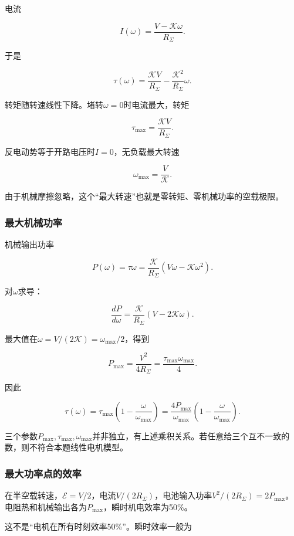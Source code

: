 \documentclass[12pt,a4paper,fontset=fandol]{ctexart}
\begin{document}
电流

\[
I(\omega)=\frac{V-\mathcal K\omega}{R_\Sigma}.
\]

于是

\[
\boxed{\tau(\omega)=\frac{\mathcal K V}{R_\Sigma}
-\frac{\mathcal K^2}{R_\Sigma}\omega}.
\]

转矩随转速线性下降。堵转\(\omega=0\)时电流最大，转矩

\[
\boxed{\tau_{\max}=\frac{\mathcal K V}{R_\Sigma}}.
\]

反电动势等于开路电压时\(I=0\)，无负载最大转速

\[
\boxed{\omega_{\max}=\frac V{\mathcal K}}.
\]

由于机械摩擦忽略，这个``最大转速''也就是零转矩、零机械功率的空载极限。

\subsubsection{最大机械功率}\label{ux6700ux5927ux673aux68b0ux529fux7387}

机械输出功率

\[
P(\omega)=\tau\omega
=\frac{\mathcal K}{R_\Sigma}
(V\omega-\mathcal K\omega^2).
\]

对\(\omega\)求导：

\[
\frac{dP}{d\omega}
=\frac{\mathcal K}{R_\Sigma}(V-2\mathcal K\omega).
\]

最大值在\(\omega=V/(2\mathcal K)=\omega_{\max}/2\)，得到

\[
\boxed{P_{\max}=\frac{V^2}{4R_\Sigma}
=\frac{\tau_{\max}\omega_{\max}}4}.
\]

因此

\[
\boxed{
\tau(\omega)=\tau_{\max}
\left(1-\frac\omega{\omega_{\max}}\right)
=\frac{4P_{\max}}{\omega_{\max}}
\left(1-\frac\omega{\omega_{\max}}\right)}.
\]

三个参数\(P_{\max},\tau_{\max},\omega_{\max}\)并非独立，有上述乘积关系。若任意给三个互不一致的数，则不符合本题线性电机模型。

\subsubsection{最大功率点的效率}\label{ux6700ux5927ux529fux7387ux70b9ux7684ux6548ux7387}

在半空载转速，\(\mathcal E=V/2\)，电流\(V/(2R_\Sigma)\)，电池输入功率\(V^2/(2R_\Sigma)=2P_{\max}\)。电阻热和机械输出各为\(P_{\max}\)，瞬时机电效率为50\%。

这不是``电机在所有时刻效率50\%''。瞬时效率一般为
\end{document}
